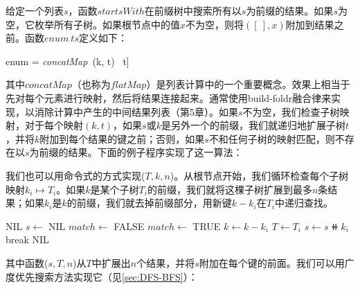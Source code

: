 \documentclass[b5paper]{ctexart}
\begin{document}
给定一个列表$s$，函数$startsWith$在前缀树中搜索所有以$s$为前缀的结果。如果$s$为空，它枚举所有子树。如果根节点中的值$x$不为空，则将$([\ ], x)$附加到结果之前。函数$enum\ ts$定义如下：

\be
enum = \textit{concatMap}\ (k, t) \mapsto [(k \doubleplus a, b) | (a, b) \in startsWith\ [\ ]\ t]
\ee

\label{sec:list-concatmap}
其中$\textit{concatMap}$（也称为$flatMap$）是列表计算中的一个重要概念。效果上相当于先对每个元素进行映射，然后将结果连接起来。通常使用build-foldr融合律来实现，以消除计算中产生的中间结果列表（\cite{unplugged}第5章）。如果$s$不为空，我们检查子树映射，对于每个映射$(k, t)$，如果$s$或$k$是另外一个的前缀，我们就递归地扩展子树$t$，并将$k$附加到每个结果的键之前；否则，如果$s$不和任何子树的映射匹配，则不存在以$s$为前缀的结果。下面的例子程序实现了这一算法：


我们也可以用命令式的方式实现($T, k, n$)。从根节点开始，我们循环检查每个子树映射$k_i \mapsto T_i$。如果$k$是某个子树$T_i$的前缀，我们就将这棵子树扩展到最多$n$条结果；如果$k_i$是$k$的前缀，我们就去掉前缀部分，用新键$k - k_i$在$T_i$中递归查找。

\begin{algorithmic}[1]
     \State \Return NIL
  \EndIf
  \State $s \gets$ NIL
  \Repeat
    \State $match \gets$ FALSE
        \State \Return {}
      \EndIf
        \State $match \gets$ TRUE
        \State $k \gets k - k_i$  
        \State $T \gets T_i$
        \State $s \gets s \doubleplus k_i$
        \State break
      \EndIf
    \EndFor
  \State \Return NIL
\EndFunction
\end{algorithmic}

其中函数($s, T, n$)从$T$中扩展出$n$个结果，并将$s$附加在每个键的前面。我们可以用广度优先搜索方法实现它（见\ref{sec:DFS-BFS}）：
\end{document}
